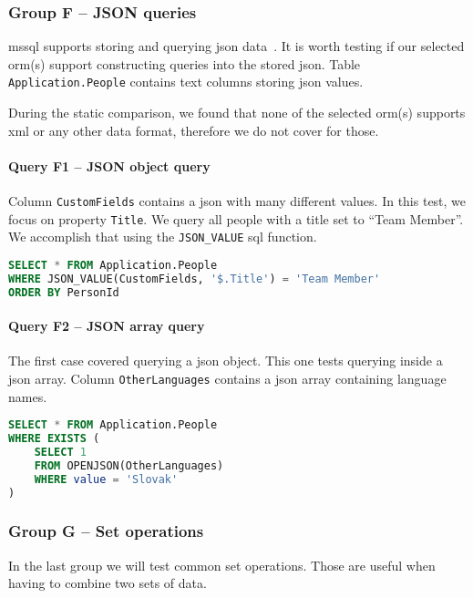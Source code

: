\subsubsection{Group F -- JSON queries}
\acrshort{mssql} supports storing and querying \acrshort{json} data~\cite{mssqljson}. It is worth testing if our selected \acrshort{orm}(s) support constructing queries into the stored \acrshort{json}.
Table \texttt{Application.People} contains text columns storing \acrshort{json} values.

During the static comparison, we found that none of the selected \acrshort{orm}(s) supports \acrshort{xml} or any other data format, therefore we do not cover for those.

\paragraph{Query F1 -- JSON object query}
\label{query:f1}
Column \texttt{CustomFields} contains a \acrshort{json} with many different values. In this test, we focus on property \texttt{Title}. We query all people with a title set to ``Team Member''.
We accomplish that using the \texttt{JSON\_VALUE} \acrshort{sql} function.

\begin{lstlisting}[language=SQL]
SELECT * FROM Application.People
WHERE JSON_VALUE(CustomFields, '$.Title') = 'Team Member'
ORDER BY PersonId
\end{lstlisting}

\paragraph{Query F2 -- JSON array query}
\label{query:f2}
The first case covered querying a \acrshort{json} object. This one tests querying inside a \acrshort{json} array. Column \texttt{OtherLanguages} contains a \acrshort{json} array containing language names.

\begin{lstlisting}[language=SQL]
SELECT * FROM Application.People
WHERE EXISTS (
    SELECT 1
    FROM OPENJSON(OtherLanguages)
    WHERE value = 'Slovak'
)
\end{lstlisting}

\subsubsection{Group G -- Set operations}
In the last group we will test common set operations. Those are useful when having to combine two sets of data.

